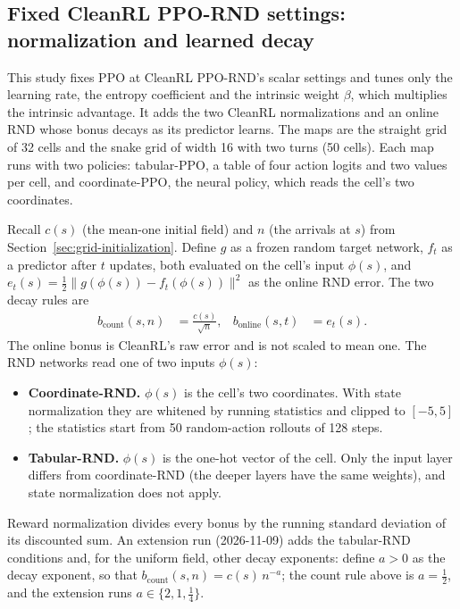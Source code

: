 \subsection{Fixed CleanRL PPO-RND settings: normalization and learned decay}
\label{sec:grid-fixed-settings}
This study fixes PPO at CleanRL PPO-RND's scalar settings and tunes only the learning rate,
the entropy coefficient and the intrinsic weight $\beta$, which multiplies the intrinsic
advantage. It adds the two CleanRL normalizations and an online RND whose bonus decays as its
predictor learns. The maps are the straight grid of 32 cells and the snake grid of width 16
with two turns (50 cells). Each map runs with two policies: tabular-PPO, a table of four action
logits and two values per cell, and coordinate-PPO, the neural policy, which reads the cell's
two coordinates.

Recall $c(s)$ (the mean-one initial field) and $n$ (the arrivals at $s$) from
Section~\ref{sec:grid-initialization}. Define $g$ as a frozen random target network, $f_t$ as a
predictor after $t$ updates, both evaluated on the cell's input $\phi(s)$, and
$e_t(s)=\tfrac12\lVert g(\phi(s))-f_t(\phi(s))\rVert^2$ as the online RND error. The two decay
rules are
\begin{align}
b_{\mathrm{count}}(s,n) &= \frac{c(s)}{\sqrt n}, &
b_{\mathrm{online}}(s,t) &= e_t(s).
\end{align}
The online bonus is CleanRL's raw error and is not scaled to mean one. The RND networks read
one of two inputs $\phi(s)$:
\begin{itemize}[leftmargin=*]
\item \textbf{Coordinate-RND.} $\phi(s)$ is the cell's two coordinates. With state normalization
they are whitened by running statistics and clipped to $[-5,5]$; the statistics start from 50
random-action rollouts of 128 steps.
\item \textbf{Tabular-RND.} $\phi(s)$ is the one-hot vector of the cell. Only the input layer
differs from coordinate-RND (the deeper layers have the same weights), and state normalization
does not apply.
\end{itemize}
Reward normalization divides every bonus by the running standard deviation of its discounted
sum. An extension run (2026-11-09) adds the tabular-RND conditions and, for the uniform field,
other decay exponents: define $a>0$ as the decay exponent, so that
$b_{\mathrm{count}}(s,n)=c(s)\,n^{-a}$; the count rule above is $a=\tfrac12$, and the extension
runs $a\in\{2,1,\tfrac14\}$.

